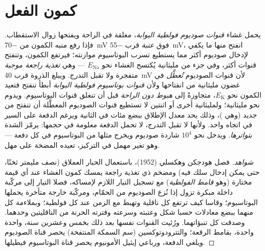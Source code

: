 \section{كمون الفعل}

\begin{proposition}[الدفعة]\label{prop:b2:neurons-synapses:ap}
يحمل غشاء  \emph{قنوات صوديوم فولطية البوابة}، مغلقة
في الراحة ويفتحها زوال الاستقطاب. فإذا رفع منبه
الكمون من \qty{-70}{mV} فوق \emph{عتبة} قرب
\qty{-55}{mV}، انفتح منها ما يكفي لإدخال صوديوم أكثر مما
يستطيع تسرب البوتاسيوم موازنته؛ فيرتفع الكمون، وتنفتح قنوات أكثر،
وفي جزء من مليثانية يُكتسح الغشاء نحو
$E_{\mathrm{Na}}$ --- وهي \emph{تغذية راجعة موجبة} متفجرة
ولا تقبل التدرج. ويبلغ الذروة قرب \qty{+40}{mV} لأن قنوات
الصوديوم \emph{تُعطَّل} في غضون مليثانية من انفتاحها ولأن
\emph{قنوات بوتاسيوم فولطية البوابة} أبطأ تنفتح
فتعيد الكمون نحو $E_{\mathrm K}$، متجاوزةً إلى
\emph{هبوط دون الراحة} قبل أن تنغلق قنوات البوتاسيوم. ويدوم
\emph{} نحو مليثانية؛ ولمليثانية أخرى
أو اثنتين لا تستطيع قنوات الصوديوم المعطَّلة أن تنفتح من جديد
(وهي \emph{})، وذلك يحد معدل الإطلاق ببضع
مئات في الثانية ويرغم الدفعة على السير في اتجاه واحد.
ولأنها لا تقبل التدرج، لا تحمل الدفعة معلومة في
حجمها:  يرمّز الشدة \emph{بتواترها}. ويدخل نحو
$10^{4}$ شاردة صوديوم ويخرج مثلها من البوتاسيوم في كل
دفعة --- وهو تغير مهمل في التركيز، تعيده
المضخة على مهل.
\end{proposition}
\begin{proof}[شواهد]
فصل هودجكن وهكسلي (1952)، باستعمال  الحبار العملاق (نصف
مليمتر ثخنًا، حتى يمكن إدخال سلك فيه) ومضخم
ذي تغذية راجعة يمسك كمون الغشاء عند أي قيمة
مختارة (وهو \emph{قامط الفولطية}) مع تسجيل التيار اللازم
لإمساكه، فصلا التيار إلى مركّبة داخلة مبكرة
تزول إذا نُزع الصوديوم من الحمّام، ومركّبة خارجة
متأخرة يحملها البوتاسيوم؛ وقاسا كيف ترتفع كل
ناقلية وتهبط مع الزمن عند كل فولطية؛ وبملاءمة
كل منهما ببضع معادلات حسبا شكل 
وعتبته وسرعته وفترته الحرنة من الناقليتين
وحدهما. وصدقت كل تنبؤاتهما. ورُئيت القنوات نفسها
بعد ذلك بخمس وعشرين سنة، واحدة واحدة، بقامط الرقعة؛
والتترودوتوكسين (سم السمكة المنتفخة) يحصر قناة الصوديوم
ويلغي الدفعة، ورباعي إيثيل الأمونيوم يحصر قناة
البوتاسيوم فيطيلها.
\end{proof}

